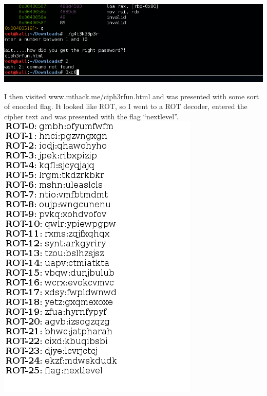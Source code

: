 \documentclass[12pt]{report}
\begin{document}
\includegraphics[scale=0.33, width=\linewidth]{img/ciph3rfunhtml.PNG}

I then visited www.mthack.me/ciph3rfun.html and was presented with some sort of enocded flag. It looked like ROT, so I went to a ROT decoder, entered the cipher text and was presented with the flag ``nextlevel''.\\
\includegraphics[scale=0.33, width=\linewidth]{img/nextlevel.PNG}
\end{document}
